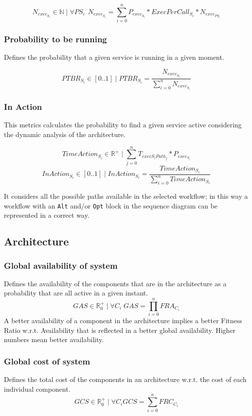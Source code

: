 \[ N_{exec_{S_i}} \in \mathbb{N} \; | \; \forall PS_i \;\, N_{exec_{S_i}} = \sum_{i=0}^{n} P_{exec_{S_i}} * ExecPerCall_{S_i} * N_{exec_{PS_i}} \]

\subsubsection{Probability to be running}
Defines the probability that a given service is running in a given moment.

\[ PTBR_{S_i} \in [0..1] \; | \; PTBR_{S_i} =  \frac{{N_{exec_{S_i}}}}{ \sum_{i=0}^{n}  N_{exec_{S_i}}} \]

\subsubsection{In Action}
This metrics calculates the probability to find a given service active considering the dynamic analysis of the architecture.

\[ TimeAction_{S_i} \in \mathbb{R}^+ \; | \; \sum_{j=0}^{n} T_{exec{S_i}Path_j} * P_{exec_{S_i}} \]
\[ InAction_{S_i} \in [0..1] \; | \; InAction_{S_i} = \frac{TimeAction_{S_i}}{{\sum_{i=0}^n}TimeAction_{S_i}} \]

It considers all the possible paths available in the selected workflow; in this way a workflow with an \texttt{Alt} and/or \texttt{Opt} block in the sequence diagram can be represented in a correct way.

\subsection{Architecture}
\subsubsection{Global availability of system}
Defines the availability of the components that are in the architecture as a probability that are all active in a given instant.
\[ GAS \in \mathbb{R}^+_0 \; | \; \forall C_i \; GAS = \prod_{i=0}^{n} FRA_{C_i} \]
A better availability of a component in the architecture implies a better Fitness Ratio w.r.t. Availability that is reflected in a better global availability. Higher numbers mean better availability.
\subsubsection{Global cost of system}
Defines the total cost of the components in an architecture w.r.t. the cost of each individual component.
\[ GCS \in \mathbb{R}^+_0 \; | \; \forall C_i GCS = \sum_{i=0}^{n} FRC_{C_i} \]

